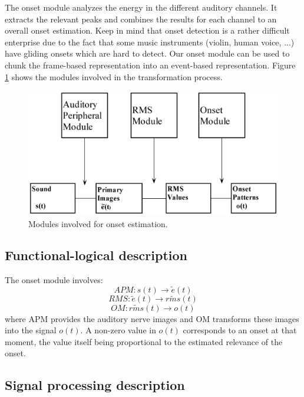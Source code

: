 The onset module analyzes the energy in the different auditory
channels. It extracts the relevant peaks and combines the results
for each channel to an overall onset estimation. Keep in mind that
onset detection is a rather difficult enterprise due to the fact
that some music instruments (violin, human voice, ...) have
gliding onsets which are hard to detect. Our onset module can be
used to chunk the frame-based representation into an event-based
representation. Figure \ref{Fig:OMModule} shows the modules
involved in the transformation process.
\begin{figure}[h]
    \centering
    \includegraphics[width=\IPEMDefaultFigureWidth]{Graphics/OMModule}
    \caption{Modules involved for onset estimation.}
    \label{Fig:OMModule}
\end{figure}

\subsection{Functional-logical description}

The onset module involves:
\[APM: s(t) \rightarrow \tilde{e}(t)\]
\[RMS: \tilde{e}(t) \rightarrow \widetilde{rms}(t)\]
\[OM: \widetilde{rms}(t) \rightarrow o(t)\]
where APM provides the auditory nerve images and OM transforms
these images into the signal $o(t)$. A non-zero value in $o(t)$
corresponds to an onset at that moment, the value itself being
proportional to the estimated relevance of the onset.

\subsection{Signal processing description}

